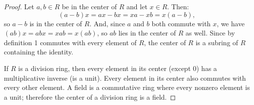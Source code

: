\documentclass{article}
\begin{document}
\begin{proof}
    Let $a, b \in R$ be in the center of $R$ and let $x \in R$. Then:
    \begin{equation*}
        (a - b)x = ax - bx = xa - xb = x(a - b),
    \end{equation*}
    so $a - b$ is in the center of $R$. And, since $a$ and $b$ both commute with $x$, we have $(ab)x = abx = xab = x(ab)$, so $ab$ lies in the center of $R$ as well. Since by definition 1 commutes with every element of $R$, the center of $R$ is a subring of $R$ containing the identity.

    If $R$ is a division ring, then every element in its center (except 0) has a multiplicative inverse (is a unit). Every element in its center also commutes with every other element. A field is a commutative ring where every nonzero element is a unit; therefore the center of a division ring is a field.
\end{proof}
\end{document}
